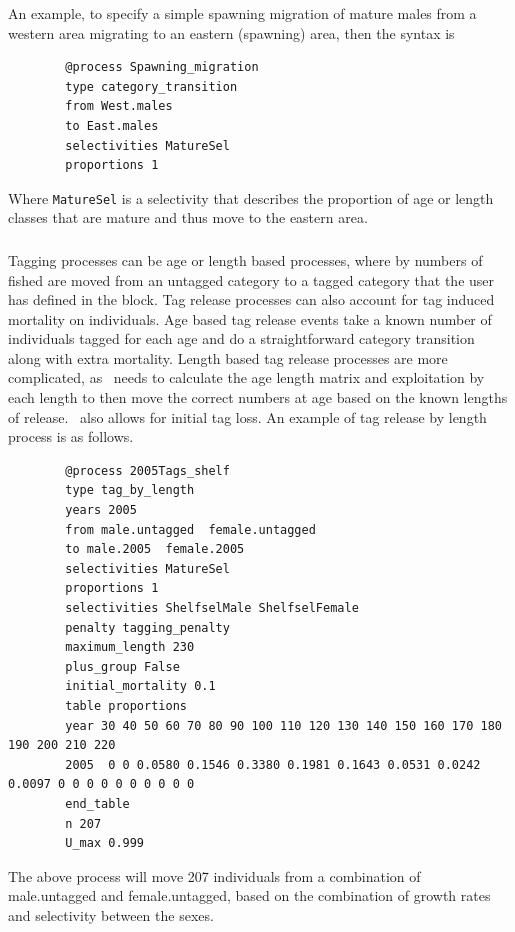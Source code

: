 An example, to specify a simple spawning migration of mature males from a western area migrating to an eastern (spawning) area, then the syntax is
{\small{\begin{verbatim}
		@process Spawning_migration
		type category_transition 
		from West.males	
		to East.males	
		selectivities MatureSel
		proportions 1
		\end{verbatim}}}

Where \texttt{MatureSel} is a selectivity that describes the proportion of age or length classes that are mature and thus move to the eastern area.

\subsubsection{}\label{sub:tag_release}

Tagging processes can be age or length based processes, where by numbers of fished are moved from an untagged category to a tagged category that the user has defined in the  block. Tag release processes can also account for tag induced mortality on individuals. Age based tag release events take a known number of individuals tagged for each age and do a straightforward category transition along with extra mortality. Length based tag release processes are more complicated, as \CNAME\ needs to calculate the age length matrix and exploitation by each length to then move the correct numbers at age based on the known lengths of release. \CNAME\ also allows for initial tag loss. An example of tag release by length process is as follows. 

{\small{\begin{verbatim}
		@process 2005Tags_shelf
		type tag_by_length 
		years 2005
		from male.untagged  female.untagged
		to male.2005  female.2005	
		selectivities MatureSel
		proportions 1
		selectivities ShelfselMale ShelfselFemale
		penalty tagging_penalty
		maximum_length 230
		plus_group False
		initial_mortality 0.1
		table proportions
		year 30 40 50 60 70 80 90 100 110 120 130 140 150 160 170 180 190 200 210 220
		2005  0 0 0.0580 0.1546 0.3380 0.1981 0.1643 0.0531 0.0242 0.0097 0 0 0 0 0 0 0 0 0 0
		end_table
		n 207
		U_max 0.999
		\end{verbatim}}}

The above process will move 207 individuals from a combination of male.untagged and female.untagged, based on the combination of growth rates and selectivity between the sexes.

